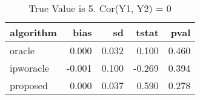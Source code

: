 \begin{table}[h!]
\caption{True Value is 5. Cor(Y1, Y2) = 0}
\centering
\begin{tabular}[t]{lrrrr}
\toprule
algorithm & bias & sd & tstat & pval\\
\midrule
oracle & 0.000 & 0.032 & 0.100 & 0.460\\
ipworacle & -0.001 & 0.100 & -0.269 & 0.394\\
proposed & 0.000 & 0.037 & 0.590 & 0.278\\
\bottomrule
\end{tabular}
\end{table}
